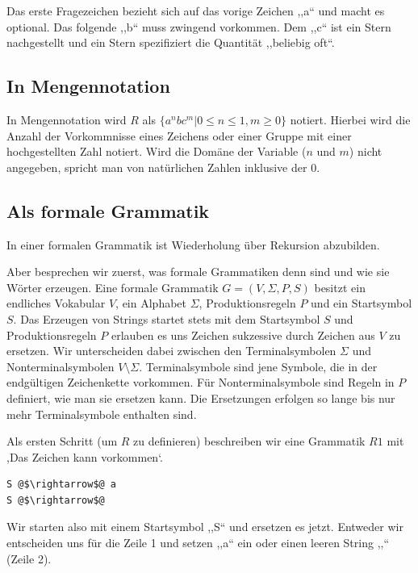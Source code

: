Das erste Fragezeichen bezieht sich auf das vorige Zeichen ,,a`` und macht es optional. Das folgende ,,b`` muss zwingend vorkommen. Dem ,,c`` ist ein Stern nachgestellt und ein Stern spezifiziert die Quantität ,,beliebig oft``.

\subsection{In Mengennotation}
%
In Mengennotation wird $R$ als $\{a^n b c^m | 0\leq n\leq 1, m \geq 0\}$ notiert. Hierbei wird die Anzahl der Vorkommnisse eines Zeichens oder einer Gruppe mit einer hochgestellten Zahl notiert. Wird die Domäne der Variable ($n$ und $m$) nicht angegeben, spricht man von natürlichen Zahlen inklusive der 0.

\subsection{Als formale Grammatik}
%
In einer formalen Grammatik ist Wiederholung über Rekursion abzubilden.

Aber besprechen wir zuerst, was formale Grammatiken denn sind und wie sie Wörter erzeugen. Eine formale Grammatik $G = (V, \Sigma, P, S)$ besitzt ein endliches Vokabular $V$, ein Alphabet $\Sigma$, Produktionsregeln $P$ und ein Startsymbol $S$. Das Erzeugen von Strings startet stets mit dem Startsymbol $S$ und Produktionsregeln $P$ erlauben es uns Zeichen sukzessive durch Zeichen aus $V$ zu ersetzen. Wir unterscheiden dabei zwischen den Terminalsymbolen $\Sigma$ und Nonterminalsymbolen $V \setminus \Sigma$. Terminalsymbole sind jene Symbole, die in der endgültigen Zeichenkette vorkommen. Für Nonterminalsymbole sind Regeln in $P$ definiert, wie man sie ersetzen kann. Die Ersetzungen erfolgen so lange bis nur mehr Terminalsymbole enthalten sind.

Als ersten Schritt (um $R$ zu definieren) beschreiben wir eine Grammatik $R1$ mit ,Das Zeichen  kann vorkommen`.
\begin{lstlisting}
S @$\rightarrow$@ a
S @$\rightarrow$@
\end{lstlisting}

Wir starten also mit einem Startsymbol ,,S`` und ersetzen es jetzt. Entweder wir entscheiden uns für die Zeile 1 und setzen ,,a`` ein oder einen leeren String ,,`` (Zeile 2).

